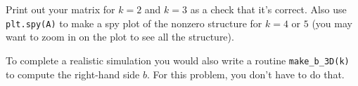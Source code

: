 \documentclass[11pt]{article}
\begin{document}
Print out your matrix for $k=2$ and $k=3$ as a check that it's correct. 
Also use {\tt plt.spy(A)} to make a spy plot of the nonzero structure 
for $k=4$ or $5$ (you may want to zoom in on the plot to see all the structure).

To complete a realistic simulation you would also 
write a routine {\tt make\_b\_3D(k)} to compute the right-hand side $b$.
For this problem, you don't have to do that.
\end{document}
